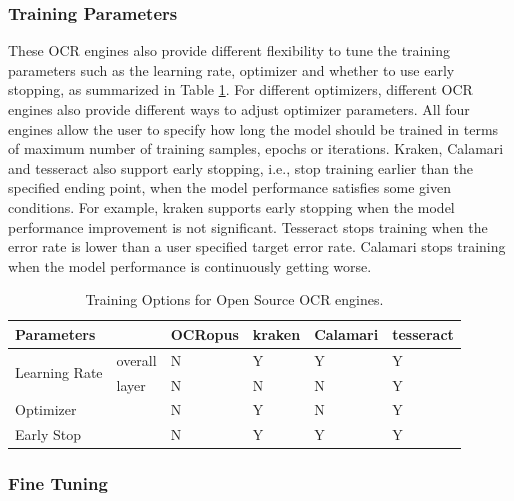 \documentclass[conference]{IEEEtran}
\begin{document}
\subsubsection*{Training Parameters}

These OCR engines also provide different flexibility to tune the training
parameters such as the learning rate, optimizer and whether to use early
stopping, as summarized in Table \ref{tab:training_options}. For different
optimizers, different OCR engines also provide different ways to adjust
optimizer parameters. All four engines allow the user to specify how long the
model should be trained in terms of maximum number of training samples, epochs
or iterations. Kraken, Calamari and tesseract also support early stopping,
i.e., stop training earlier than the specified ending point, when the model
performance satisfies some given conditions. For example, kraken supports early
stopping when the model performance improvement is not significant. Tesseract
stops training when the error rate is lower than a user specified target error
rate. Calamari stops training when the model performance is continuously
getting worse.

\begin{table}[bt]
\begin{tabular}{llllll}
\hline
Parameters & & OCRopus     & kraken                      & Calamari & tesseract\\ \hline
\multirow{2}{*}{Learning Rate}& overall & N & Y & Y & Y\\ 
&layer & N & N  & N & Y \\
\hline
Optimizer &  &  N & Y & N & Y \\\hline
Early Stop & & N & Y & Y & Y \\
\end{tabular}
\caption{Training Options for Open Source OCR engines.}
\label{tab:training_options}
\end{table}
\subsubsection*{Fine Tuning}
\end{document}
